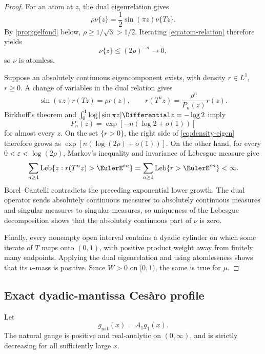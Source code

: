 \documentclass[11pt,oneside]{article}
\theoremstyle{definition}
\theoremstyle{remark}
\newcommand{\T}{T}
\begin{document}
\begin{proof}
For an atom at \(z\), the dual eigenrelation gives
\begin{equation}
 \rho\nu\{z\}=\frac12\sin(\pi z)\nu\{\T z\}.
 \label{eq:atom-relation}
\end{equation}
By \cref{prop:gelfond} below,
\(\rho\ge1/\sqrt3>1/2\).  Iterating
\eqref{eq:atom-relation} therefore yields
\[
 \nu\{z\}\le(2\rho)^{-n}\longrightarrow0,
\]
so \(\nu\) is atomless.

Suppose an absolutely continuous eigencomponent exists, with density
\(r\in L^1\), \(r\ge0\).  A change of variables in the dual relation gives
\begin{equation}
 \sin(\pi z)r(\T z)=\rho r(z),
 \qquad
 r(\T^nz)=\frac{\rho^n}{P_n(z)}r(z).
 \label{eq:density-eigen}
\end{equation}
Birkhoff's theorem and
\(\int_0^1\log|\sin\pi z|\Differential z=-\log2\) imply
\[
 P_n(z)=\exp[-n(\log2+o(1))]
\]
for almost every \(z\).  On the set \(\{r>0\}\), the right side of
\eqref{eq:density-eigen} therefore grows as
\(\exp[n(\log(2\rho)+o(1))]\).  On the other hand, for every
\(0<\varepsilon<\log(2\rho)\), Markov's inequality and invariance of
Lebesgue measure give
\[
 \sum_{n\ge1}\operatorname{Leb}\{z:r(\T^nz)>\EulerE^{\varepsilon n}\}
 =\sum_{n\ge1}\operatorname{Leb}\{r>\EulerE^{\varepsilon n}\}<\infty.
\]
Borel--Cantelli contradicts the preceding exponential lower growth.  The
dual operator sends absolutely continuous measures to absolutely continuous
measures and singular measures to singular measures, so uniqueness of the
Lebesgue decomposition shows that the absolutely continuous part of \(\nu\)
is zero.

Finally, every nonempty open interval contains a dyadic cylinder on which some
iterate of \(\T\) maps onto \((0,1)\), with positive product weight away from
finitely many endpoints.  Applying the dual eigenrelation and using
atomlessness shows that its \(\nu\)-mass is positive.  Since \(W>0\) on
\([0,1)\), the same is true for \(\mu\).
\end{proof}

\subsection{Exact dyadic-mantissa Ces\`aro profile}

Let
\begin{equation}
 g_{\mathrm{nat}}(x)=A_1g_1(x).
 \label{eq:gnat}
\end{equation}
The natural gauge is positive and real-analytic on \((0,\infty)\), and is
strictly decreasing for all sufficiently large \(x\).
\end{document}
